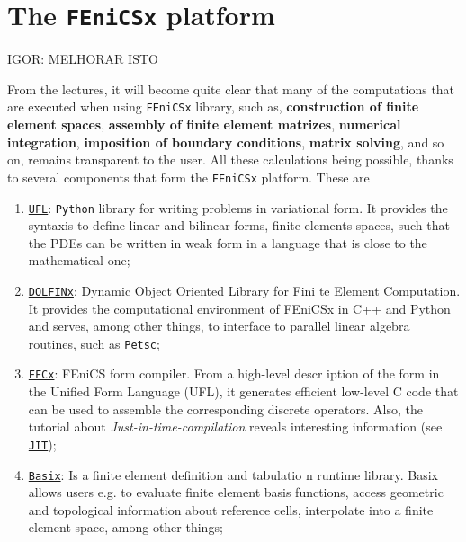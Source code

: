 \section{The \texttt{FEniCSx} platform}

IGOR: MELHORAR ISTO

From the lectures, it will become quite clear that many of the computations
that are executed when using \texttt{FEniCSx} library, such as,
\textbf{construction of finite element spaces}, \textbf{assembly of finite element
	matrizes}, \textbf{numerical integration}, \textbf{imposition of boundary conditions},
\textbf{matrix solving}, and so on, 
remains transparent to the user. All these calculations being possible,
thanks to several components that form the \texttt{FEniCSx} platform. 
These are

\begin{enumerate}
	
	\item \href{https://github.com/FEniCS/dolfinx}{\texttt{UFL}}: \texttt{Python} library for writing problems
	in variational form. It
	provides the syntaxis to define linear and bilinear forms, finite elements spaces, such that the PDEs can 
	be written in weak form
	in a language that is close to the mathematical one;\\
	
	\item \href{https://github.com/FEniCS/dolfinx}{\texttt{DOLFINx}}: Dynamic Object Oriented Library for Fini
	te Element Computation.
	It provides the computational environment of FEniCSx in C++ and Python and serves, among other things,
	to interface to parallel linear algebra routines, such as \texttt{Petsc}; \\ 
	
	\item \href{https://github.com/FEniCS/ffcx}{\texttt{FFCx}}: FEniCS form compiler.  From a high-level descr
	iption of the form in the Unified Form Language (UFL), it generates efficient low-level C code that can be
	used to assemble the corresponding discrete operators. Also, the tutorial about \emph{Just-in-time-compilation} reveals interesting information (see \href{https://jorgensd.github.io/dolfinx-tutorial/chapter4/com
		piler_parameters.html}{\texttt{JIT}}); \\
	
	\item \href{https://github.com/FEniCS/basix}{\texttt{Basix}}: Is a finite element definition and tabulatio
	n runtime library.
	Basix allows users e.g. to evaluate finite element basis functions, access geometric and topological information about reference cells,
	interpolate into a finite element space, among other things;
	
\end{enumerate}

